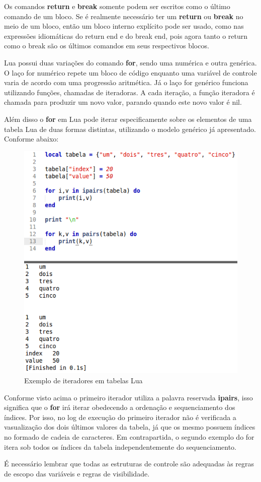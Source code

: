\documentclass[
12pt, %
openright, %
oneside, %
a4paper, %
english, %
brazil, %
]{abntex2}
\begin{document}
Os comandos \textbf{return} e \textbf{break} somente podem ser escritos como o último comando de um bloco. Se é realmente necessário ter um \textbf{return} ou \textbf{break} no meio de um bloco, então um bloco interno explícito pode ser usado, como nas expressões idiomáticas do return end e do break end, pois agora tanto o return como o break são os últimos comandos em seus respectivos blocos.

Lua possui duas variações do comando \textbf{for}, sendo uma numérica e outra genérica. O laço for numérico repete um bloco de código enquanto uma variável de controle varia de acordo com uma progressão aritmética. Já o laço for genérico funciona utilizando funções, chamadas de iteradoras. A cada iteração, a função iteradora é chamada para produzir um novo valor, parando quando este novo valor é nil.

Além disso o \textbf{for} em Lua pode iterar especificamente sobre os elementos de uma tabela Lua de duas formas distintas, utilizando o modelo genérico já apresentado. Conforme abaixo:

\begin{figure}[H]
\centering
\includegraphics[width=0.5\linewidth]{imagens/for.png}
\caption{Exemplo de iteradores em tabelas Lua}
\end{figure}

Conforme visto acima o primeiro iterador utiliza a palavra reservada \textbf{ipairs}, isso significa que o \textbf{for} irá iterar obedecendo a ordenação e sequenciamento dos índices. Por isso, no log de execução do primeiro iterador não é verificada a vasualização dos dois últimos valores da tabela, já que os mesmo possuem índices no formado de cadeia de caracteres. Em contrapartida, o segundo exemplo do for itera sob todos os índices da tabela independentemente do sequenciamento.

É necessário lembrar que todas as estruturas de controle são adequadas às regras de escopo das variáveis e regras de visibilidade. 
\end{document}
